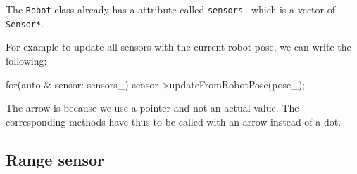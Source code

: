 \documentclass{ecnreport}
\begin{document}
The \texttt{Robot} class already has a attribute called \texttt{sensors\_} which is a vector of \texttt{Sensor*}.

For example to update all sensors with the current robot pose, we can write the following:
\begin{cppcode}
    for(auto & sensor: sensors_)
	sensor->updateFromRobotPose(pose_);
\end{cppcode}The arrow is because we use a pointer and not an actual value. The corresponding methods have thus to be 
called with an arrow instead of a dot.





\subsection{Range sensor}
\end{document}
